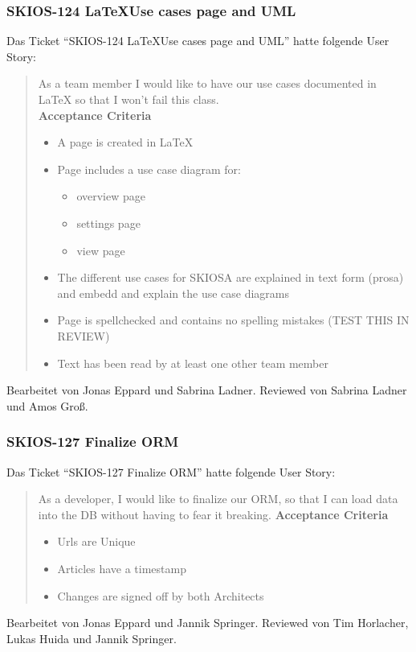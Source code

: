 \subsubsection{SKIOS-124 \LaTeX Use cases page and UML}
Das Ticket \enquote{SKIOS-124 \LaTeX Use cases page and UML} hatte folgende User Story:
\begin{quotation}
    As a team member I would like to have our use cases documented in LaTeX so that I won't fail this class. \\
\textbf{Acceptance Criteria}
\begin{itemize}
    \item A page is created in LaTeX
    \item Page includes a use case diagram for:
    \begin{itemize}
        \item overview page
        \item settings page
        \item view page
    \end{itemize}
    \item The different use cases for SKIOSA are explained in text form (prosa) and embedd and explain the use case diagrams
    \item Page is spellchecked and contains no spelling mistakes (TEST THIS IN REVIEW)
    \item Text has been read by at least one other team member
\end{itemize}
\end{quotation}
Bearbeitet von Jonas Eppard und Sabrina Ladner.
Reviewed von Sabrina Ladner und Amos Groß.

\subsubsection{SKIOS-127 Finalize ORM}
Das Ticket \enquote{SKIOS-127 Finalize ORM} hatte folgende User Story:
\begin{quotation}
    As a developer, I would like to finalize our ORM, so that I can load data into the DB without having to fear it breaking.
\textbf{Acceptance Criteria}
\begin{itemize}
    \item Urls are Unique
    \item Articles have a timestamp
    \item Changes are signed off by both Architects
\end{itemize}
\end{quotation}
Bearbeitet von Jonas Eppard und Jannik Springer.
Reviewed von Tim Horlacher, Lukas Huida und Jannik Springer.

